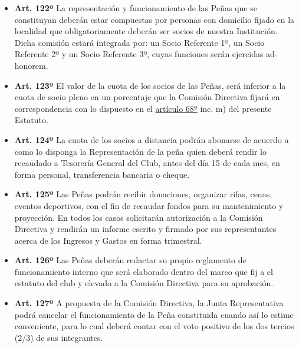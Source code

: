 \documentclass[]{book}
\providecommand{\tightlist}{%
  \setlength{\itemsep}{0pt}\setlength{\parskip}{0pt}}
\begin{document}
\begin{itemize}
\tightlist
\item
  \textbf{Art. 122º} La representación y funcionamiento de las Peñas que
  se constituyan deberán estar compuestas por personas con domicilio
  fijado en la localidad que obligatoriamente deberán ser socios de
  nuestra Institución. Dicha comisión estará integrada por: un Socio
  Referente 1º, un Socio Referente 2º y un Socio Referente 3º, cuyas
  funciones serán ejercidas ad-honorem.
\end{itemize}

\begin{itemize}
\tightlist
\item
  \textbf{Art. 123º} El valor de la cuota de los socios de las Peñas,
  será inferior a la cuota de socio pleno en un porcentaje que la
  Comisión Directiva fijará en correspondencia con lo dispuesto en el
  \protect\hyperlink{art68}{artículo 68º} inc. m) del presente Estatuto.
\end{itemize}

\begin{itemize}
\tightlist
\item
  \textbf{Art. 124º} La cuota de los socios a distancia podrán abonarse
  de acuerdo a como lo disponga la Representación de la peña quien
  deberá rendir lo recaudado a Tesorería General del Club, antes del día
  15 de cada mes, en forma personal, transferencia bancaria o cheque.
\end{itemize}

\begin{itemize}
\tightlist
\item
  \textbf{Art. 125º} Las Peñas podrán recibir donaciones, organizar
  rifas, cenas, eventos deportivos, con el fin de recaudar fondos para
  su mantenimiento y proyección. En todos los casos solicitarán
  autorización a la Comisión Directiva y rendirán un informe escrito y
  firmado por sus representantes acerca de los Ingresos y Gastos en
  forma trimestral.
\end{itemize}

\begin{itemize}
\tightlist
\item
  \textbf{Art. 126º} Las Peñas deberán redactar su propio reglamento de
  funcionamiento interno que será elaborado dentro del marco que fij a
  el estatuto del club y elevado a la Comisión Directiva para su
  aprobación.
\end{itemize}

\begin{itemize}
\tightlist
\item
  \textbf{Art. 127º} A propuesta de la Comisión Directiva, la Junta
  Representativa podrá cancelar el funcionamiento de la Peña constituida
  cuando así lo estime conveniente, para lo cual deberá contar con el
  voto positivo de los dos tercios (2/3) de sus integrantes.
\end{itemize}
\end{document}

